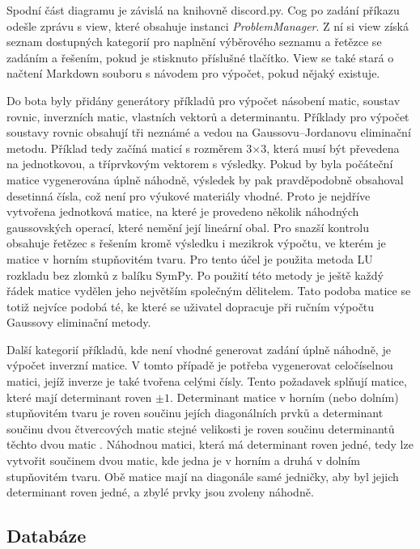 \documentclass[FM]{tulthesis}
\begin{document}
	Spodní část diagramu je závislá na knihovně discord.py. Cog po zadání příkazu odešle zprávu s view, které obsahuje instanci \textit{ProblemManager}. Z ní si view získá seznam dostupných kategorií pro naplnění výběrového seznamu a řetězce se zadáním a řešením, pokud je stisknuto příslušné tlačítko. View se také stará o načtení Markdown souboru s návodem pro výpočet, pokud nějaký existuje.
	
	Do bota byly přidány generátory příkladů pro výpočet násobení matic, soustav rovnic, inverzních matic, vlastních vektorů a determinantu. Příklady pro výpočet soustavy rovnic obsahují tři neznámé a vedou na Gaussovu–Jordanovu eliminační metodu. Příklad tedy začíná maticí s rozměrem 3$\times$3, která musí být převedena na jednotkovou, a tříprvkovým vektorem s výsledky. Pokud by byla počáteční matice vygenerována úplně náhodně, výsledek by pak pravděpodobně obsahoval desetinná čísla, což není pro výukové materiály vhodné. Proto je nejdříve vytvořena jednotková matice, na které je provedeno několik náhodných gaussovských operací, které nemění její lineární obal. Pro snazší kontrolu obsahuje řetězec s řešením kromě výsledku i mezikrok výpočtu, ve kterém je matice v horním stupňovitém tvaru. Pro tento účel je použita metoda LU rozkladu bez zlomků z balíku SymPy. Po použití této metody je ještě každý řádek matice vydělen jeho největším společným dělitelem. Tato podoba matice se totiž nejvíce podobá té, ke které se uživatel dopracuje při ručním výpočtu Gaussovy eliminační metody.
	
	Další kategorií příkladů, kde není vhodné generovat zadání úplně náhodně, je výpočet inverzní matice. V tomto případě je potřeba vygenerovat celočíselnou matici, jejíž inverze je také tvořena celými čísly. Tento požadavek splňují matice, které mají determinant roven $\pm1$. Determinant matice v horním (nebo dolním) stupňovitém tvaru je roven součinu jejích diagonálních prvků a determinant součinu dvou čtvercových matic stejné velikosti je roven součinu determinantů těchto dvou matic \cite{lit_lingebra}. Náhodnou matici, která má determinant roven jedné, tedy lze vytvořit součinem dvou matic, kde jedna je v horním a druhá v dolním stupňovitém tvaru. Obě matice mají na diagonále samé jedničky, aby byl jejich determinant roven jedné, a zbylé prvky jsou zvoleny náhodně.
	
	
	\subsection{Databáze}
	
\end{document}
